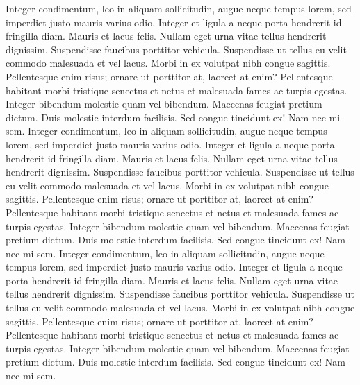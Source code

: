 \documentclass{memoir}
\begin{document}
\beginnumbering
\pstart
Integer condimentum, leo in aliquam sollicitudin, augue neque tempus lorem, sed imperdiet justo mauris varius odio. Integer et ligula a neque porta hendrerit id fringilla diam. Mauris et lacus felis. Nullam eget urna vitae tellus hendrerit dignissim. Suspendisse faucibus porttitor vehicula. Suspendisse ut tellus eu velit commodo malesuada et vel lacus. Morbi in ex volutpat nibh congue sagittis. Pellentesque enim risus; ornare ut porttitor at, laoreet at enim? Pellentesque habitant morbi tristique senectus et netus et malesuada fames ac turpis egestas. Integer bibendum molestie quam vel bibendum. Maecenas feugiat pretium dictum. Duis molestie interdum facilisis. Sed congue tincidunt ex! Nam nec mi sem.
Integer condimentum, leo in aliquam sollicitudin, augue neque tempus lorem, sed imperdiet justo mauris varius odio. Integer et ligula a neque porta hendrerit id fringilla diam. Mauris et lacus felis. Nullam eget urna vitae tellus hendrerit dignissim. Suspendisse faucibus porttitor vehicula. Suspendisse ut tellus eu velit commodo malesuada et vel lacus. Morbi in ex volutpat nibh congue sagittis. Pellentesque enim risus; ornare ut porttitor at, laoreet at enim? Pellentesque habitant morbi tristique senectus et netus et malesuada fames ac turpis egestas. Integer bibendum molestie quam vel bibendum. Maecenas feugiat pretium dictum. Duis molestie interdum facilisis. Sed congue tincidunt ex! Nam nec mi sem.
Integer condimentum, leo in aliquam sollicitudin, augue neque tempus lorem, sed imperdiet justo mauris varius odio. Integer et ligula a neque porta hendrerit id fringilla diam. Mauris et lacus felis. Nullam eget urna vitae tellus hendrerit dignissim. Suspendisse faucibus porttitor vehicula. Suspendisse ut tellus eu velit commodo malesuada et vel lacus. Morbi in ex volutpat nibh congue sagittis. Pellentesque enim risus; ornare ut porttitor at, laoreet at enim? Pellentesque habitant morbi tristique senectus et netus et malesuada fames ac turpis egestas. Integer bibendum molestie quam vel bibendum. Maecenas feugiat pretium dictum. Duis molestie interdum facilisis. Sed congue tincidunt ex! Nam nec mi sem.
\end{document}
